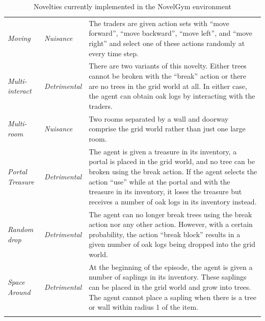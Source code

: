 \begin{table}[!tb]
\begin{tabular}{p{2.2cm} p{2.2cm} p{9cm}}
    \emph{Moving} & \emph{Nuisance} & The traders are given action sets with ``move forward'', ``move backward'', ``move left'', and ``move right'' and select one of these actions randomly at every time step. \tabularnewline
    \arrayrulecolor{taupegray} \midrule
    
    \emph{Multi-interact} & \emph{Detrimental} & There are two variants of this novelty. Either trees cannot be broken with the ``break'' action or there are no trees in the grid world at all. In either case, the agent can obtain oak logs by interacting with the traders. \tabularnewline
    \arrayrulecolor{taupegray} \midrule
    
    \emph{Multi-room} & \emph{Nuisance} & Two rooms separated by a wall and doorway comprise the grid world rather than just one large room. \tabularnewline
    \arrayrulecolor{taupegray} \midrule
    
    \emph{Portal Treasure} & \emph{Detrimental} & The agent is given a treasure in its inventory, a portal is placed in the grid world, and no tree can be broken using the break action. If the agent selects the action ``use'' while at the portal and with the treasure in its inventory, it loses the treasure but receives a number of oak logs in its inventory instead. \tabularnewline
    \arrayrulecolor{taupegray} \midrule
    
    \emph{Random drop} & \emph{Detrimental} & The agent can no longer break trees using the break action nor any other action. However, with a certain probability, the action ``break block'' results in a given number of oak logs being dropped into the grid world. \tabularnewline
    \arrayrulecolor{taupegray} \midrule
    
    \emph{Space Around} & \emph{Detrimental} & At the beginning of the episode, the agent is given a number of saplings in its inventory. These saplings can be placed in the grid world and grow into trees. The agent cannot place a sapling when there is a tree or wall within radius 1 of the item. \tabularnewline
    \arrayrulecolor{taupegray} \bottomrule
    
    \end{tabular}
    \caption{Novelties currently implemented in the NovelGym environment}
    \label{tab:rl_systemic_examples}
\end{table}